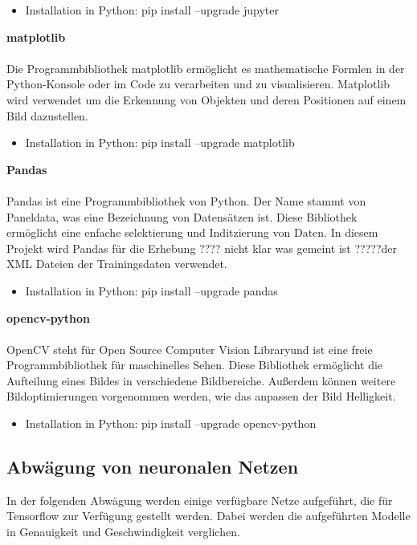 \documentclass[a4paper,12pt,oneside]{article}
\begin{document}
\begin{itemize}
\item Installation in Python: pip install --upgrade jupyter
  \end{itemize}
  
\textbf{matplotlib}\\\\
Die Programmbibliothek matplotlib ermöglicht es mathematische Formlen in der Python-Konsole oder im Code zu verarbeiten und zu visualisieren.
Matplotlib wird verwendet um die Erkennung von Objekten und deren Positionen auf einem Bild dazustellen.

  \begin{itemize}
\item Installation in Python: pip install --upgrade matplotlib
  \end{itemize}
  
\textbf{Pandas}\\\\
Pandas ist eine Programmbibliothek von Python. Der Name stammt von \glqq Paneldata\grqq, was eine Bezeichnung von Datensätzen ist. Diese Bibliothek ermöglicht eine enfache selektierung und Inditzierung von Daten. In diesem Projekt wird Pandas für die Erhebung ???? nicht klar was gemeint ist ?????der XML Dateien der Trainingsdaten verwendet.

  \begin{itemize}
\item Installation in Python: pip install --upgrade pandas
  \end{itemize}
  
\textbf{opencv-python}\\\\
OpenCV steht für \glqq Open Source Computer Vision Library\grqq  und ist eine freie Programmbibliothek für maschinelles Sehen. Diese Bibliothek ermöglicht die Aufteilung eines Bildes in verschiedene Bildbereiche. Außerdem können weitere Bildoptimierungen vorgenommen werden, wie das anpassen der Bild Helligkeit.

  \begin{itemize}
\item Installation in Python: pip install --upgrade opencv-python
  \end{itemize}

  \subsection{Abwägung von neuronalen Netzen} 
In der folgenden Abwägung werden einige verfügbare Netze aufgeführt, die für Tensorflow zur Verfügung gestellt werden. Dabei werden die aufgeführten Modelle in Genauigkeit und Geschwindigkeit verglichen.
 
\end{document}
